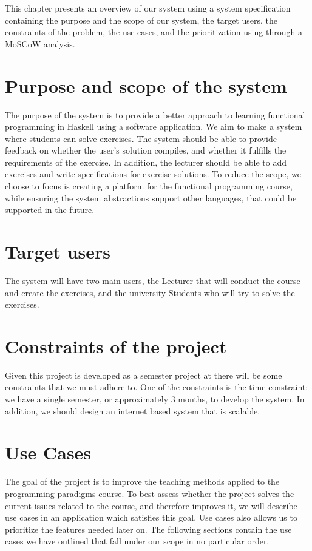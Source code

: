 This chapter presents an overview of our system using a system specification containing the purpose and the scope of our system, the target users, the constraints of the problem, the use cases, and the prioritization using through a MoSCoW analysis.

\section*{Purpose and scope of the system }
The purpose of the system is to provide a better approach to learning functional programming in Haskell using a software application.
We aim to make a system where students can solve exercises. The system should be able to provide feedback on whether the user's solution compiles, and whether it fulfills the requirements of the exercise. 
In addition, the lecturer should be able to add exercises and write specifications for exercise solutions.
To reduce the scope, we choose to focus is creating a platform for the functional programming course, while ensuring the system abstractions support other languages, that could be supported in the future.

\section*{Target users}
The system will have two main users, the Lecturer that will conduct the course and create the exercises, and the university Students who will try to solve the exercises.


\section*{Constraints of the project}
Given this project is developed as a semester project at \aau{} there will be some constraints that we must adhere to. 
One of the constraints is the time constraint: we have a single semester, or approximately 3 months, to develop the system. 
In addition, we should design an internet based system that is scalable. 
 
\section*{Use Cases}
The goal of the project is to improve the teaching methods applied to the programming paradigms course. 
To best assess whether the project solves the current issues related to the course, and therefore improves it, we will describe use cases in an application which satisfies this goal.
Use cases also allows us to prioritize the features needed later on.
The following sections contain the use cases we have outlined that fall under our scope in no particular order.  

